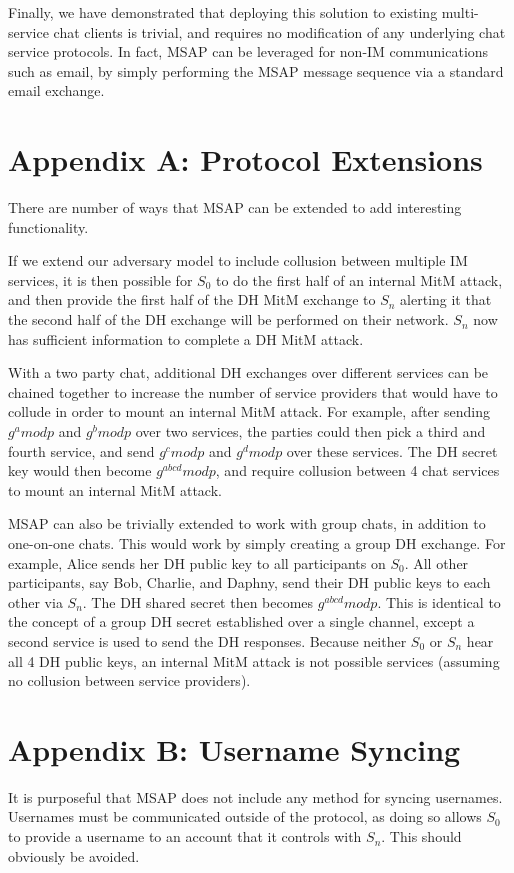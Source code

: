 \documentclass[twoside,10pt]{article}
\begin{document}
\begin{multicols}{2}
Finally, we have demonstrated that deploying this solution to existing multi-service chat clients is trivial, and requires no modification of any underlying chat service protocols.  In fact, MSAP can be leveraged for non-IM communications such as email, by simply performing the MSAP message sequence via a standard email exchange.

\section{Appendix A: Protocol Extensions}
There are number of ways that MSAP can be extended to add interesting functionality.  

If we extend our adversary model to include collusion between multiple IM services, it is then possible for $S_0$ to do the first half of an internal MitM attack, and then provide the first half of the DH MitM exchange to $S_n$ alerting it that the second half of the DH exchange will be performed on their network.  $S_n$ now has sufficient information to complete a DH MitM attack.

With a two party chat, additional DH exchanges over different services can be chained together to increase the number of service providers that would have to collude in order to mount an internal MitM attack.  For example, after sending $g^a mod p$ and $g^b mod p$ over two services, the parties could then pick a third and fourth service, and send $g^c mod p$ and $g^d mod p$ over these services.  The DH secret key would then become $g^{abcd} mod p$, and require collusion between 4 chat services to mount an internal MitM attack.


MSAP can also be trivially extended to work with group chats, in addition to one-on-one chats.  This would work by simply creating a group DH exchange.  For example, Alice sends her DH public key to all participants on $S_0$.  All other participants, say Bob, Charlie, and Daphny, send their DH public keys to each other via $S_n$.  The DH shared secret then becomes $g^{abcd} mod p$.  This is identical to the concept of a group DH secret established over a single channel, except a second service is used to send the DH responses.  Because neither $S_0$ or $S_n$ hear all 4 DH public keys, an internal MitM attack is not possible services (assuming no collusion between service providers).

\section{Appendix B: Username Syncing}
It is purposeful that MSAP does not include any method for syncing usernames.  Usernames must be communicated outside of the protocol, as doing so allows $S_0$ to provide a username to an account that it controls with $S_n$.  This should obviously be avoided.


\end{multicols}
\end{document}

